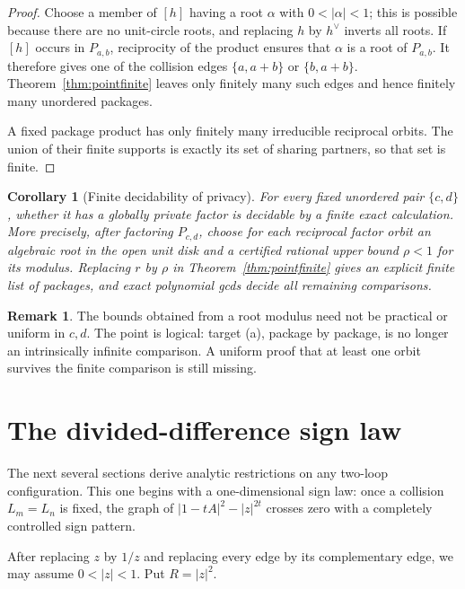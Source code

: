 \documentclass[11pt]{article}
\numberwithin{equation}{section}
\newtheorem{corollary}[theorem]{Corollary}
\theoremstyle{definition}
\newtheorem{remark}[theorem]{Remark}
\begin{document}
\begin{proof}
Choose a member of \([h]\) having a root \(\alpha\) with
\(0<|\alpha|<1\); this is possible because there are no unit-circle roots,
and replacing \(h\) by \(h^\vee\) inverts all roots.  If \([h]\) occurs
in \(P_{a,b}\), reciprocity of the product ensures that \(\alpha\) is a
root of \(P_{a,b}\).  It therefore gives one of the collision edges
\(\{a,a+b\}\) or \(\{b,a+b\}\).  Theorem~\ref{thm:pointfinite} leaves
only finitely many such edges and hence finitely many unordered packages.

A fixed package product has only finitely many irreducible reciprocal orbits.
The union of their finite supports is exactly its set of sharing partners, so
that set is finite.
\end{proof}

\begin{corollary}[Finite decidability of privacy]
\label{cor:privacydecidable}
For every fixed unordered pair \(\{c,d\}\), whether it has a globally
private factor is decidable by a finite exact calculation.  More precisely,
after factoring \(P_{c,d}\), choose for each reciprocal factor orbit an
algebraic root in the open unit disk and a certified rational upper bound
\(\rho<1\) for its modulus.  Replacing \(r\) by \(\rho\) in
Theorem~\ref{thm:pointfinite} gives an explicit finite list of packages, and
exact polynomial gcds decide all remaining comparisons.
\end{corollary}

\begin{remark}
The bounds obtained from a root modulus need not be practical or uniform in
\(c,d\).  The point is logical: target (a), package by package, is no longer
an intrinsically infinite comparison.  A uniform proof that at least one
orbit survives the finite comparison is still missing.
\end{remark}

\section{The divided-difference sign law}

The next several sections derive analytic restrictions on any two-loop configuration.  This one begins with a one-dimensional sign law: once a collision \(L_m=L_n\) is fixed, the graph of \(|1-tA|^2-|z|^{2t}\) crosses zero with a completely controlled sign pattern.

After replacing \(z\) by \(1/z\) and replacing every edge by its complementary
edge, we may assume \(0<|z|<1\).  Put \(R=|z|^2\).
\end{document}
